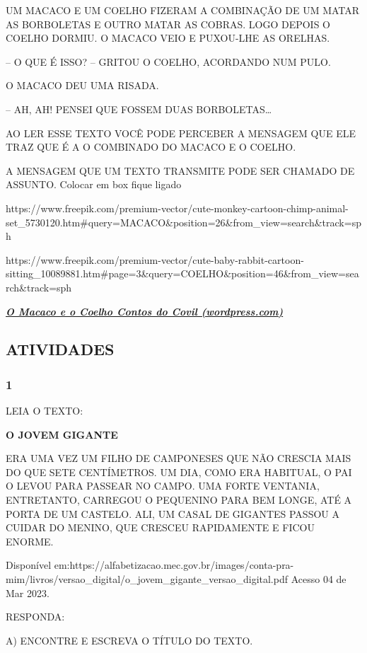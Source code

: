 UM MACACO E UM COELHO FIZERAM A COMBINAÇÃO DE UM MATAR AS BORBOLETAS E
OUTRO MATAR AS COBRAS. LOGO DEPOIS O COELHO DORMIU. O MACACO VEIO E
PUXOU-LHE AS ORELHAS.

-- O QUE É ISSO? -- GRITOU O COELHO, ACORDANDO NUM PULO.

O MACACO DEU UMA RISADA.

-- AH, AH! PENSEI QUE FOSSEM DUAS BORBOLETAS\ldots{}

AO LER ESSE TEXTO VOCÊ PODE PERCEBER A MENSAGEM QUE ELE TRAZ QUE É A O
COMBINADO DO MACACO E O COELHO.

A MENSAGEM QUE UM TEXTO TRANSMITE PODE SER CHAMADO DE ASSUNTO. Colocar
em box fique ligado

https://www.freepik.com/premium-vector/cute-monkey-cartoon-chimp-animal-set\_5730120.htm\#query=MACACO\&position=26\&from\_view=search\&track=sph

https://www.freepik.com/premium-vector/cute-baby-rabbit-cartoon-sitting\_10089881.htm\#page=3\&query=COELHO\&position=46\&from\_view=search\&track=sph

\href{https://contosdocovil.wordpress.com/2008/05/17/o-macaco-e-o-coelho/}{\textbf{\emph{O
Macaco e o Coelho \textbar{} Contos do Covil (wordpress.com)}}}

\subsection{ATIVIDADES}\label{atividades-4}

\subsubsection{1 }\label{section-55}

LEIA O TEXTO:

\protect\hypertarget{_Hlk129095095}{}{}\textbf{O JOVEM GIGANTE}

ERA UMA VEZ UM FILHO DE CAMPONESES QUE NÃO CRESCIA MAIS DO QUE SETE
CENTÍMETROS. UM DIA, COMO ERA HABITUAL, O PAI O LEVOU PARA PASSEAR NO
CAMPO. UMA FORTE VENTANIA, ENTRETANTO, CARREGOU O PEQUENINO PARA BEM
LONGE, ATÉ A PORTA DE UM CASTELO. ALI, UM CASAL DE GIGANTES PASSOU A
CUIDAR DO MENINO, QUE CRESCEU RAPIDAMENTE E FICOU ENORME.

Disponível
em:https://alfabetizacao.mec.gov.br/images/conta-pra-mim/livros/versao\_digital/o\_jovem\_gigante\_versao\_digital.pdf
Acesso 04 de Mar 2023.

RESPONDA:

A) ENCONTRE E ESCREVA O TÍTULO DO TEXTO.

